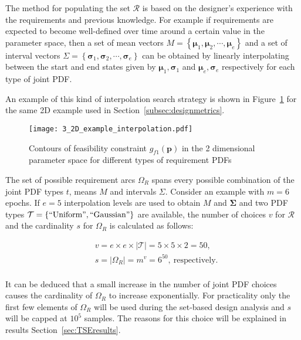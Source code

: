 The method for populating the set $\mathcal{R}$ is based on the designer's experience with the requirements and previous knowledge. For example if requirements are expected to become well-defined over time around a certain value in the parameter space, then a set of mean vectors $M = \left\{\boldsymbol{\mu}_1,\boldsymbol{\mu}_2,\cdots,\boldsymbol{\mu}_e\right\}$ and a set of interval vectors $\Sigma = \left\{\boldsymbol{\sigma}_1,\boldsymbol{\sigma}_2,\cdots,\boldsymbol{\sigma}_e\right\}$ can be obtained by linearly interpolating between the start and end states given by $\boldsymbol{\mu}_1,\boldsymbol{\sigma}_1$ and $\boldsymbol{\mu}_e,\boldsymbol{\sigma}_e$ respectively for each type of joint \ac{PDF}. 

An example of this kind of interpolation search strategy is shown in Figure~\ref{fig:2Dexampleinterp} for the same 2D example used in Section~\ref{subsec:designmetrics}.

\begin{figure}[h!]
	\centering
	\texttt{[image: 3\_2D\_example\_interpolation.pdf]}
	\caption{Contours of feasibility constraint $g_{f1}(\mathbf{p})$ in the 2 dimensional parameter space for different types of requirement \acp{PDF}}
	\label{fig:2Dexampleinterp}
\end{figure}

The set of possible requirement arcs $\Omega_R$ spans every possible combination of the joint \ac{PDF} types $t$, means $M$ and intervals $\Sigma$. Consider an example with $m=6$ epochs. If $e=5$ interpolation levels are used to obtain $M$ and $\boldsymbol{\Sigma}$ and two \ac{PDF} types $\mathcal{T} = \left\{\mathrm{``Uniform"},\mathrm{``Gaussian"}\right\}$ are available, the number of choices $v$ for $\mathcal{R}$ and the cardinality $s$ for $\Omega_R$ is calculated as follows:

\begin{equation*}
	\begin{aligned}
		& v = e \times e \times |\mathcal{T}| = 5 \times 5 \times 2 = 50,\\
		& s = |\Omega_R| = m^v = 6^{50},~\mathrm{respectively}.\\
	\end{aligned}
\end{equation*}

It can be deduced that a small increase in the number of joint \ac{PDF} choices causes the cardinality of $\Omega_R$ to increase exponentially. For practicality only the first few elements of $\Omega_R$ will be used during the set-based design analysis and $s$ will be capped at $10^5$ samples. The reasons for this choice will be explained in results Section~\ref{sec:TSEresults}.

